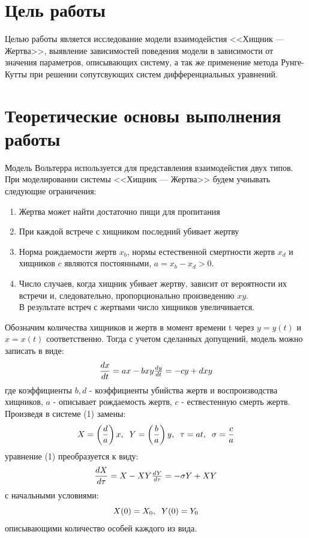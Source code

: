 \documentclass[a4paper,12pt]{article}
\begin{document}
\section{Цель работы}
\hspace{0.5cm} Целью работы является исследование модели взаимодейстия <<Хищник --- Жертва>>,
выявление зависимостей поведения модели в зависимости от значения параметров,
описывающих систему, а так же применение метода Рунге-Кутты при решении сопутсвующих систем дифференциальных 
уравнений.
\section{Теоретические основы выполнения работы}
\hspace{0.5cm} Модель Вольтерра используется для представления взаимодейстия двух типов. 
При моделировании системы <<Хищник --- Жертва>> будем учиывать следующие ограничения:
\begin{enumerate}
    \item Жертва может найти достаточно пищи для пропитания
    \item При каждой встрече с хищником последний убивает жертву
    \item Норма рождаемости жертв $x_b$, нормы естественной смертности жертв $x_d$ и\\
    хищников $c$ являются постоянными, $a = x_b - x_d > 0$.
    \item Число случаев, когда хищник убивает жертву, зависит от вероятности их
    встречи и, следовательно, пропорционально произведению $xy$. \\
    В результате встреч с жертвами число хищников увеличивается.
\end{enumerate}

Обозначим количества хищников и жертв в момент времени t через $y = y(t)$ и $x = x(t)$
соответственно. Тогда с учетом сделанных допущений, модель можно записать в виде:
\begin{equation}
    \frac{dx}{dt} = ax - bxy $$ $$
    \frac{dy}{dt} = -cy + dxy
\end{equation}
где коэффициенты $b, d$ - коэффициенты убийства жертв и воспроизводства хищников,
$a$ - описывает рождаемость жертв, $c$ - ествестенную смерть жертв. \\
Произведя в системе (1) замены:
\begin{equation*}
    X = \left(\frac{d}{a}\right)x, \hspace{0.2cm} Y = \left(\frac{b}{a}\right)y, \hspace{0.2cm} \tau = at, \hspace{0.2cm} \sigma = \frac{c}{a}
\end{equation*}
уравнение (1) преобразуется к виду:
\newpage
\begin{equation}
    \frac{dX}{d\tau} = X - XY $$ $$
    \frac{dY}{d\tau} = -\sigma Y + XY
\end{equation}
с начальными условиями:
\begin{equation}
    X(0) = X_0, \hspace{0.2cm} Y(0) = Y_0
\end{equation}
описывающими количество особей каждого из вида.
\newpage
\end{document}
